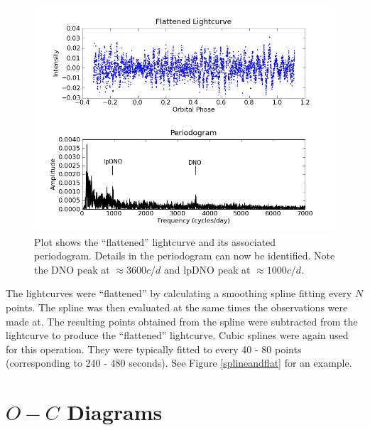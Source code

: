 \begin{figure}
\begin{center}
\includegraphics[width=0.85\columnwidth,bb=0 0 600 400]{images/flattened.png}

\caption[Flattened lightcurve and periodogram]{Plot shows the ``flattened'' lightcurve and its associated periodogram. Details in the periodogram can now be identified. Note the DNO peak at $\approx 3600 c/d$ and lpDNO peak at $\approx 1000 c/d$. }
\label{flat}
\end{center}
\end{figure}

The lightcurves were ``flattened'' by calculating a smoothing spline fitting every $N$ points. The spline was then evaluated at the same times the observations were made at. The resulting points obtained from the spline were subtracted from the lightcurve to produce the ``flattened'' lightcurve. Cubic splines were again used for this operation. They were typically fitted to every 40 - 80 points (corresponding to 240 - 480 seconds). See Figure \ref{splineandflat} for an example.


\section{$O-C$ Diagrams}

\label{ominc_section}

